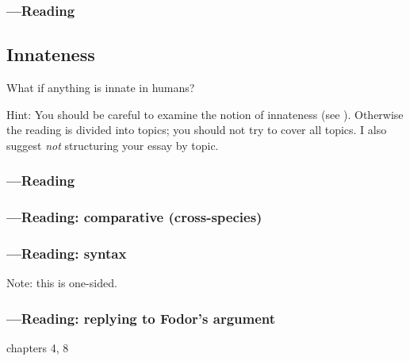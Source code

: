 \documentclass[12pt,\papersize]{extarticle}
\begin{document}
\subsubsection{---Reading}





\subsection{Innateness}
What if anything is innate in humans?

Hint: You should be careful to examine the notion of innateness  (see \citealp{Samuels:2004ho}).  Otherwise the reading is divided into topics; you should not try to cover all topics.  I also suggest \emph{not} structuring your essay by topic.

\subsubsection{---Reading}


\subsubsection{---Reading: comparative (cross-species)}




\subsubsection{---Reading: syntax}

Note: this is one-sided.






\subsubsection{---Reading: replying to Fodor’s argument}


 chapters 4, 8
\end{document}
